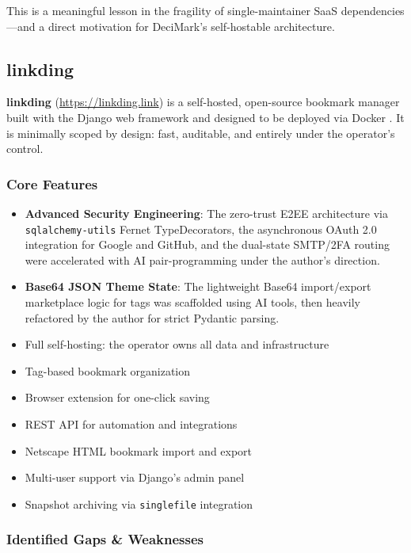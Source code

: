 \documentclass[11pt,a4paper]{book}
\begin{document}
This is a meaningful lesson in the fragility of single-maintainer SaaS dependencies---and a direct motivation for DeciMark's self-hostable architecture.

\subsection{linkding}

\textbf{linkding} (\url{https://linkding.link}) is a self-hosted, open-source bookmark manager built with the Django web framework and designed to be deployed via Docker \citep{linkding2020github}. It is minimally scoped by design: fast, auditable, and entirely under the operator's control.

\subsubsection{Core Features}

\begin{itemize}
  \item \textbf{Advanced Security Engineering}: The zero-trust E2EE architecture via \texttt{sqlalchemy-utils} Fernet TypeDecorators, the asynchronous OAuth 2.0 integration for Google and GitHub, and the dual-state SMTP/2FA routing were accelerated with AI pair-programming under the author's direction.
  \item \textbf{Base64 JSON Theme State}: The lightweight Base64 import/export marketplace logic for tags was scaffolded using AI tools, then heavily refactored by the author for strict Pydantic parsing.

  \item Full self-hosting: the operator owns all data and infrastructure
  \item Tag-based bookmark organization
  \item Browser extension for one-click saving
  \item REST API for automation and integrations
  \item Netscape HTML bookmark import and export
  \item Multi-user support via Django's admin panel
  \item Snapshot archiving via \texttt{singlefile} integration
\end{itemize}

\subsubsection{Identified Gaps \& Weaknesses}
\end{document}
